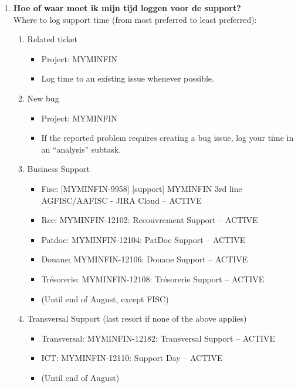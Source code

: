\begin{enumerate}
    \item \textbf{Hoe of waar moet ik mijn tijd loggen voor de support?} \\
    Where to log support time (from most preferred to least preferred):
    \begin{enumerate}
        \item Related ticket
        \begin{itemize}
            \item Project: MYMINFIN
            \item Log time to an existing issue whenever possible.
        \end{itemize}
        \item New bug
        \begin{itemize}
            \item Project: MYMINFIN
            \item If the reported problem requires creating a bug issue, log your time in an “analysis” subtask.
        \end{itemize}
        \item Business Support
        \begin{itemize}
            \item Fisc: [MYMINFIN-9958] [support] MYMINFIN 3rd line AGFISC/AAFISC - JIRA Cloud – ACTIVE
            \item Rec: MYMINFIN-12102: Recouvrement Support – ACTIVE
            \item Patdoc: MYMINFIN-12104: PatDoc Support – ACTIVE
            \item Douane: MYMINFIN-12106: Douane Support – ACTIVE
            \item Trésorerie: MYMINFIN-12108: Trésorerie Support – ACTIVE
            \item (Until end of August, except FISC)
        \end{itemize}
        \item Transversal Support (last resort if none of the above applies)
        \begin{itemize}
            \item Transversal: MYMINFIN-12182: Transversal Support – ACTIVE
            \item ICT: MYMINFIN-12110: Support Day – ACTIVE
            \item (Until end of August)
        \end{itemize}
    \end{enumerate}
    

\end{enumerate}
